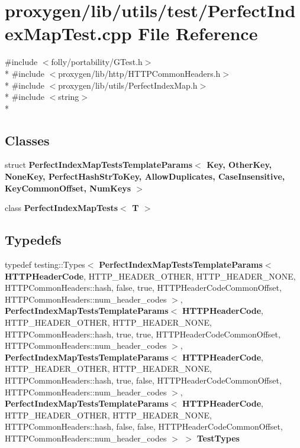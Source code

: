 \section{proxygen/lib/utils/test/\+Perfect\+Index\+Map\+Test.cpp File Reference}
\label{PerfectIndexMapTest_8cpp}
{\ttfamily \#include $<$folly/portability/\+G\+Test.\+h$>$}\\*
{\ttfamily \#include $<$proxygen/lib/http/\+H\+T\+T\+P\+Common\+Headers.\+h$>$}\\*
{\ttfamily \#include $<$proxygen/lib/utils/\+Perfect\+Index\+Map.\+h$>$}\\*
{\ttfamily \#include $<$string$>$}\\*
\subsection*{Classes}
\begin{DoxyCompactItemize}
\item 
struct {\bf Perfect\+Index\+Map\+Tests\+Template\+Params$<$ Key, Other\+Key, None\+Key, Perfect\+Hash\+Str\+To\+Key, Allow\+Duplicates, Case\+Insensitive, Key\+Common\+Offset, Num\+Keys $>$}
\item 
class {\bf Perfect\+Index\+Map\+Tests$<$ T $>$}
\end{DoxyCompactItemize}
\subsection*{Typedefs}
\begin{DoxyCompactItemize}
\item 
typedef testing\+::\+Types$<$ {\bf Perfect\+Index\+Map\+Tests\+Template\+Params}$<$ {\bf H\+T\+T\+P\+Header\+Code}, H\+T\+T\+P\+\_\+\+H\+E\+A\+D\+E\+R\+\_\+\+O\+T\+H\+ER, H\+T\+T\+P\+\_\+\+H\+E\+A\+D\+E\+R\+\_\+\+N\+O\+NE, H\+T\+T\+P\+Common\+Headers\+::hash, false, true, H\+T\+T\+P\+Header\+Code\+Common\+Offset, H\+T\+T\+P\+Common\+Headers\+::num\+\_\+header\+\_\+codes $>$, {\bf Perfect\+Index\+Map\+Tests\+Template\+Params}$<$ {\bf H\+T\+T\+P\+Header\+Code}, H\+T\+T\+P\+\_\+\+H\+E\+A\+D\+E\+R\+\_\+\+O\+T\+H\+ER, H\+T\+T\+P\+\_\+\+H\+E\+A\+D\+E\+R\+\_\+\+N\+O\+NE, H\+T\+T\+P\+Common\+Headers\+::hash, true, true, H\+T\+T\+P\+Header\+Code\+Common\+Offset, H\+T\+T\+P\+Common\+Headers\+::num\+\_\+header\+\_\+codes $>$, {\bf Perfect\+Index\+Map\+Tests\+Template\+Params}$<$ {\bf H\+T\+T\+P\+Header\+Code}, H\+T\+T\+P\+\_\+\+H\+E\+A\+D\+E\+R\+\_\+\+O\+T\+H\+ER, H\+T\+T\+P\+\_\+\+H\+E\+A\+D\+E\+R\+\_\+\+N\+O\+NE, H\+T\+T\+P\+Common\+Headers\+::hash, true, false, H\+T\+T\+P\+Header\+Code\+Common\+Offset, H\+T\+T\+P\+Common\+Headers\+::num\+\_\+header\+\_\+codes $>$, {\bf Perfect\+Index\+Map\+Tests\+Template\+Params}$<$ {\bf H\+T\+T\+P\+Header\+Code}, H\+T\+T\+P\+\_\+\+H\+E\+A\+D\+E\+R\+\_\+\+O\+T\+H\+ER, H\+T\+T\+P\+\_\+\+H\+E\+A\+D\+E\+R\+\_\+\+N\+O\+NE, H\+T\+T\+P\+Common\+Headers\+::hash, false, false, H\+T\+T\+P\+Header\+Code\+Common\+Offset, H\+T\+T\+P\+Common\+Headers\+::num\+\_\+header\+\_\+codes $>$ $>$ {\bf Test\+Types}
\end{DoxyCompactItemize}
